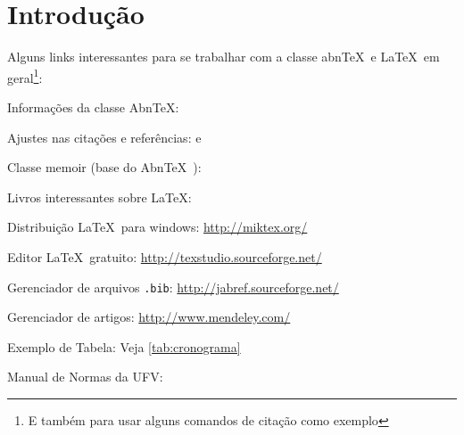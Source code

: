 \documentclass[
	12pt,				    %
	openright,			    %
	oneside,			    %
	a4paper,			    %
    sumario=tradicional,    %
	english,			    %
	brazil,				    %
	]{abntex2}
\begin{document}
\listoftables*
\cleardoublepage







\tableofcontents*
\cleardoublepage



\textual


\chapter{Introdução}\label{sec:introducao}
Alguns links interessantes para se trabalhar com a classe abn\TeX\ e \LaTeX\ em geral\footnote{E também para usar alguns comandos de citação como exemplo}:
\begin{alineas}
  \item Informações da classe Abn\TeX : 
  \item Ajustes nas citações e referências:  e 
  \item Classe memoir (base do Abn\TeX\ ): 
  \item Livros interessantes sobre \LaTeX: \cite{Dongen2012,LeslieLamport90,FrankMittelbach111,Dongen2012}
  \item Distribuição \LaTeX\ para windows: \url{http://miktex.org/}
  \item Editor \LaTeX\ gratuito: \url{http://texstudio.sourceforge.net/}
  \item Gerenciador de arquivos \texttt{.bib}: \url{http://jabref.sourceforge.net/}
  \item Gerenciador de artigos: \url{http://www.mendeley.com/}
  \item Exemplo de Tabela: Veja \autoref{tab:cronograma}
  \item Manual de Normas da UFV: 

\end{alineas}
\end{document}
